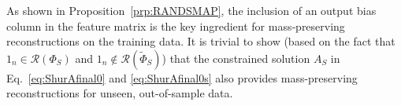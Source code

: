 \documentclass{article}
\newtheorem{corollary}{Corollary}
\begin{document}
As shown in Proposition~\ref{prp:RANDSMAP}, the inclusion of an output bias column in the feature matrix is the key ingredient for mass‑preserving reconstructions on the training data. It is trivial to show (based on the fact that $1_n\in \mathcal{R}(\Phi_S)$ and $1_n \notin \mathcal{R}(\widetilde{\Phi}_S)$) that the constrained solution $A_S$ in Eq.~\eqref{eq:ShurAfinal0} and \eqref{eq:ShurAfinal0s} also provides mass-preserving reconstructions for unseen, out-of-sample data.

\end{document}
